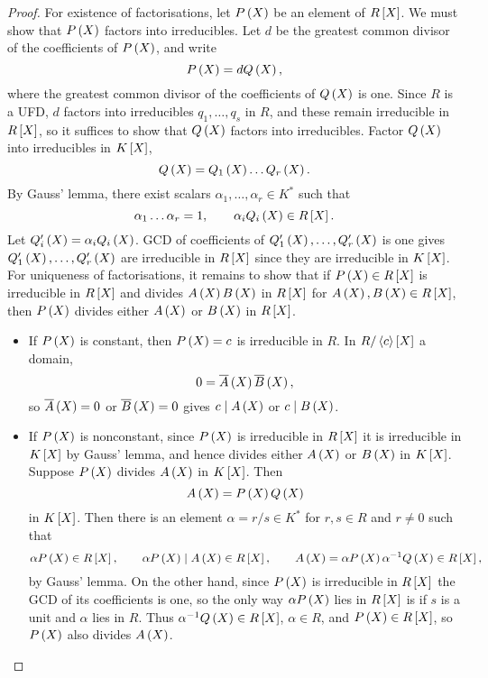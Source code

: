 \begin{proof}
For existence of factorisations, let $ P\rb{X} $ be an element of $ R\sb{X} $. We must show that $ P\rb{X} $ factors into irreducibles. Let $ d $ be the greatest common divisor of the coefficients of $ P\rb{X} $, and write
$$ P\rb{X} = dQ\rb{X}, $$
where the greatest common divisor of the coefficients of $ Q\rb{X} $ is one. Since $ R $ is a UFD, $ d $ factors into irreducibles $ q_1, \dots, q_s $ in $ R $, and these remain irreducible in $ R\sb{X} $, so it suffices to show that $ Q\rb{X} $ factors into irreducibles. Factor $ Q\rb{X} $ into irreducibles in $ K\sb{X} $,
$$ Q\rb{X} = Q_1\rb{X} \dots Q_r\rb{X}. $$
By Gauss' lemma, there exist scalars $ \alpha_1, \dots, \alpha_r \in K^* $ such that
$$ \alpha_1 \dots \alpha_r = 1, \qquad \alpha_iQ_i\rb{X} \in R\sb{X}. $$
Let $ Q'_i \rb{X} = \alpha_iQ_i\rb{X} $. GCD of coefficients of $ Q'_1\rb{X}, \dots, Q'_r\rb{X} $ is one gives $ Q'_1\rb{X}, \dots, Q'_r\rb{X} $ are irreducible in $ R\sb{X} $ since they are irreducible in $ K\sb{X} $. For uniqueness of factorisations, it remains to show that if $ P\rb{X} \in R\sb{X} $ is irreducible in $ R\sb{X} $ and divides $ A\rb{X}B\rb{X} $ in $ R\sb{X} $ for $ A\rb{X}, B\rb{X} \in R\sb{X} $, then $ P\rb{X} $ divides either $ A\rb{X} $ or $ B\rb{X} $ in $ R\sb{X} $.
\begin{itemize}
\item If $ P\rb{X} $ is constant, then $ P\rb{X} = c $ is irreducible in $ R $. In $ R / \ab{c}\sb{X} $ a domain,
$$ 0 = \overline{A}\rb{X}\overline{B}\rb{X}, $$
so $ \overline{A}\rb{X} = 0 $ or $ \overline{B}\rb{X} = 0 $ gives $ c \mid A\rb{X} $ or $ c \mid B\rb{X} $.
\item If $ P\rb{X} $ is nonconstant, since $ P\rb{X} $ is irreducible in $ R\sb{X} $ it is irreducible in $ K\sb{X} $ by Gauss' lemma, and hence divides either $ A\rb{X} $ or $ B\rb{X} $ in $ K\sb{X} $. Suppose $ P\rb{X} $ divides $ A\rb{X} $ in $ K\sb{X} $. Then
$$ A\rb{X} = P\rb{X}Q\rb{X} $$
in $ K\sb{X} $. Then there is an element $ \alpha = r / s \in K^* $ for $ r, s \in R $ and $ r \ne 0 $ such that
$$ \alpha P\rb{X} \in R\sb{X}, \qquad \alpha P\rb{X} \mid A\rb{X} \in R\sb{X}, \qquad A\rb{X} = \alpha P\rb{X}\alpha^{-1} Q\rb{X} \in R\sb{X}, $$
by Gauss' lemma. On the other hand, since $ P\rb{X} $ is irreducible in $ R\sb{X} $ the GCD of its coefficients is one, so the only way $ \alpha P\rb{X} $ lies in $ R\sb{X} $ is if $ s $ is a unit and $ \alpha $ lies in $ R $. Thus $ \alpha^{-1}Q\rb{X} \in R\sb{X} $, $ \alpha \in R $, and $ P\rb{X} \in R\sb{X} $, so $ P\rb{X} $ also divides $ A\rb{X} $.
\end{itemize}
\end{proof}

